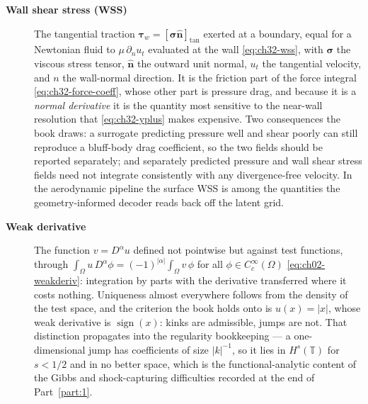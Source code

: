 \begin{description}
\item[\textbf{Wall shear stress (WSS)}] The tangential traction
$\boldsymbol{\tau}_{w} = [\boldsymbol{\sigma}\hat{\mathbf{n}}]_{\text{tan}}$ exerted at a
boundary, equal for a Newtonian fluid to $\mu\, \partial_{n} u_{t}$ evaluated at the wall
\eqref{eq:ch32-wss}, with $\boldsymbol{\sigma}$ the viscous stress tensor, $\hat{\mathbf{n}}$
the outward unit normal, $u_{t}$ the tangential velocity, and $n$ the wall-normal direction.
It is the friction part of the force integral \eqref{eq:ch32-force-coeff}, whose other part
is pressure drag, and because it is a \emph{normal derivative} it is the quantity most
sensitive to the near-wall resolution that \eqref{eq:ch32-yplus} makes expensive. Two
consequences the book draws: a surrogate predicting pressure well and shear poorly can still
reproduce a bluff-body drag coefficient, so the two fields should be reported separately; and
separately predicted pressure and wall shear stress fields need not integrate consistently
with any divergence-free velocity. In the aerodynamic pipeline the surface WSS is among the
quantities the geometry-informed decoder reads back off the latent grid.

\item[\textbf{Weak derivative}] The function $v = D^{\alpha} u$ defined not pointwise but
against test functions, through $\int_{\Omega} u\, D^{\alpha}\phi =
(-1)^{|\alpha|} \int_{\Omega} v\, \phi$ for all $\phi \in C_{c}^{\infty}(\Omega)$
\eqref{eq:ch02-weakderiv}: integration by parts with the derivative transferred where it
costs nothing. Uniqueness almost everywhere follows from the density of the test space, and
the criterion the book holds onto is $u(x) = |x|$, whose weak derivative is $\operatorname{sign}(x)$:
kinks are admissible, jumps are not. That distinction propagates into the regularity
bookkeeping --- a one-dimensional jump has coefficients of size $|k|^{-1}$, so it lies in
$H^{s}(\mathbb{T})$ for $s < 1/2$ and in no better space, which is the functional-analytic
content of the Gibbs and shock-capturing difficulties recorded at the end of Part~\ref{part:1}.


\end{description}
